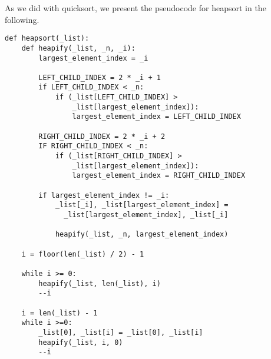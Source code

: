 As we did with quicksort, we present the pseudocode for heapsort in the following.

\begin{lstlisting}
def heapsort(_list):
    def heapify(_list, _n, _i):
        largest_element_index = _i

        LEFT_CHILD_INDEX = 2 * _i + 1
        if LEFT_CHILD_INDEX < _n:
            if (_list[LEFT_CHILD_INDEX] > 
                _list[largest_element_index]):
                largest_element_index = LEFT_CHILD_INDEX
    
        RIGHT_CHILD_INDEX = 2 * _i + 2
        IF RIGHT_CHILD_INDEX < _n:
            if (_list[RIGHT_CHILD_INDEX] >
                _list[largest_element_index]):
                largest_element_index = RIGHT_CHILD_INDEX
        
        if largest_element_index != _i:
            _list[_i], _list[largest_element_index] =
              _list[largest_element_index], _list[_i]

            heapify(_list, _n, largest_element_index)
            
    i = floor(len(_list) / 2) - 1

    while i >= 0:
        heapify(_list, len(_list), i)
        --i
    
    i = len(_list) - 1
    while i >=0:
        _list[0], _list[i] = _list[0], _list[i]
        heapify(_list, i, 0)
        --i
\end{lstlisting}